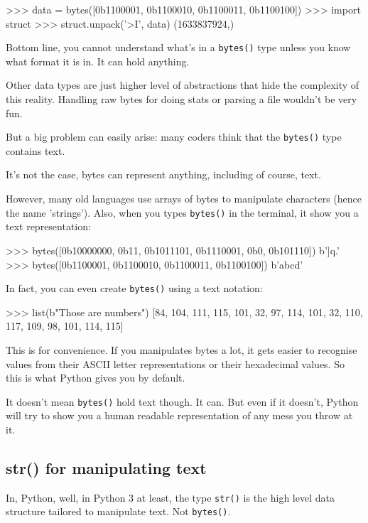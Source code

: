 \begin{py2and3}
>>> data = bytes([0b1100001, 0b1100010, 0b1100011, 0b1100100])
>>> import struct
>>> struct.unpack('>I', data)
(1633837924,)
\end{py2and3}

Bottom line, you cannot understand what's in a \lstinline{bytes()} type unless you know what format it is in. It can hold anything.

Other data types are just higher level of abstractions that hide the complexity of this reality. Handling raw bytes for doing stats or parsing a file wouldn't be very fun.

But a big problem can easily arise: many coders think that the \lstinline{bytes()} type contains text.

It's not the case, bytes can represent anything, including of course, text.

However, many old languages use arrays of bytes to manipulate characters (hence the name 'strings'). Also, when you types \lstinline{bytes()} in the terminal, it show you a text representation:


\begin{py2and3}
>>> bytes([0b10000000, 0b11, 0b1011101, 0b1110001, 0b0, 0b101110])
b']q.'
>>> bytes([0b1100001, 0b1100010, 0b1100011, 0b1100100])
b'abcd'
\end{py2and3}

In fact, you can even create \lstinline{bytes()} using a text notation:

\begin{py2and3}
>>> list(b"Those are numbers")
[84, 104, 111, 115, 101, 32, 97, 114, 101, 32, 110, 117, 109, 98, 101, 114, 115]
\end{py2and3}

This is for convenience. If you manipulates bytes a lot, it gets easier to recognise values from their ASCII letter representations or their hexadecimal values. So this is what Python gives you by default.

It doesn't mean \lstinline{bytes()} hold text though. It can. But even if it doesn't, Python will try to show you a human readable representation of any mess you throw at it.

\subsection{str() for manipulating text}

In, Python, well, in Python 3 at least, the type \lstinline{str()} is the high level data structure tailored to manipulate text. Not \lstinline{bytes()}.

